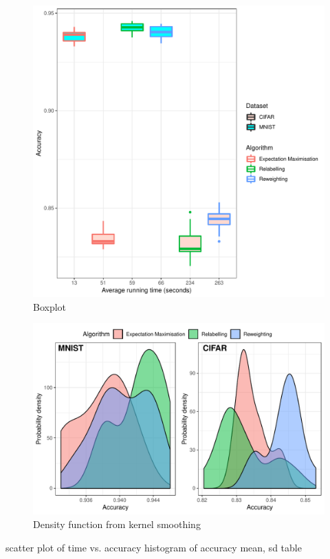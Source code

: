\documentclass{article} %
\begin{document}
\begin{figure}
	\includegraphics{boxplot.pdf}
	\caption{Boxplot}
	\label{fig:Boxplot}
\end{figure}

\begin{figure}
	 \includegraphics{histo.pdf}
	\caption{Density function from kernel smoothing}
	\label{fig:Density function from kernel smoothing}
\end{figure}

scatter plot of time vs. accuracy
histogram of accuracy
mean, sd table
\end{document}
